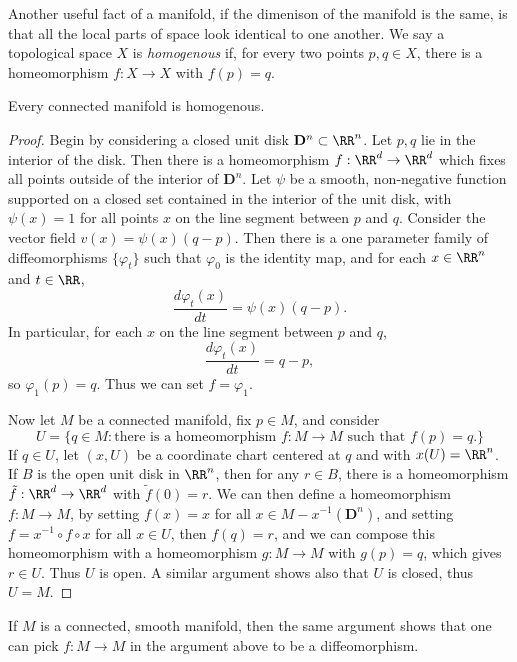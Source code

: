 Another useful fact of a manifold, if the dimenison of the manifold is the same, is that all the local parts of space look identical to one another. We say a topological space $X$ is \emph{homogenous} if, for every two points $p,q \in X$, there is a homeomorphism $f: X \to X$ with $f(p) = q$.

\begin{theorem}
    Every connected manifold is homogenous.
\end{theorem}
\begin{proof}
    Begin by considering a closed unit disk $\mathbf{D}^n \subset \RR^n$. Let $p,q$ lie in the interior of the disk. Then there is a homeomorphism $f: \RR^d \to \RR^d$ which fixes all points outside of the interior of $\mathbf{D}^n$. Let $\psi$ be a smooth, non-negative function supported on a closed set contained in the interior of the unit disk, with $\psi(x) = 1$ for all points $x$ on the line segment between $p$ and $q$. Consider the vector field $v(x) = \psi(x) (q - p)$. Then there is a one parameter family of diffeomorphisms $\{ \varphi_t \}$ such that $\varphi_0$ is the identity map, and for each $x \in \RR^n$ and $t \in \RR$,
    \[ \frac{d\varphi_t(x)}{dt} = \psi(x) (q - p). \]
    In particular, for each $x$ on the line segment between $p$ and $q$,
    \[ \frac{d\varphi_t(x)}{dt} = q - p, \]
    so $\varphi_1(p) = q$. Thus we can set $f = \varphi_1$.

    Now let $M$ be a connected manifold, fix $p \in M$, and consider
    \[ U = \{ q \in M: \text{there is a homeomorphism $f: M \to M$ such that $f(p) = q$.} \} \]
    If $q \in U$, let $(x,U)$ be a coordinate chart centered at $q$ and with $x(U) = \RR^n$. If $B$ is the open unit disk in $\RR^n$, then for any $r \in B$, there is a homeomorphism $\tilde{f}: \RR^d \to \RR^d$ with $\tilde{f}(0) = r$. We can then define a homeomorphism $f: M \to M$, by setting $f(x) = x$ for all $x \in M - x^{-1}(\mathbf{D}^n)$, and setting $f = x^{-1} \circ f \circ x$ for all $x \in U$, then $f(q) = r$, and we can compose this homeomorphism with a homeomorphism $g: M \to M$ with $g(p) = q$, which gives $r \in U$. Thus $U$ is open. A similar argument shows also that $U$ is closed, thus $U = M$.
\end{proof}

\begin{remark}
    If $M$ is a connected, smooth manifold, then the same argument shows that one can pick $f: M \to M$ in the argument above to be a diffeomorphism.
\end{remark}

